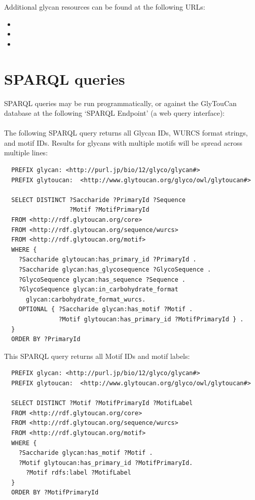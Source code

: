 \documentclass[12pt,a4paper]{article}
\begin{document}
\singlespace
\noindent Additional glycan resources can be found at the following URLs:
\begin{itemize}
\item {}
\item {}
\item {}
\end{itemize}
\doublespace
\clearpage

\section{SPARQL queries}
\label{sec:sparql_queries}
SPARQL queries may be run programmatically, or against the GlyTouCan database at the following `SPARQL Endpoint' (a web query interface):\\

\noindent {}\\

\noindent The following SPARQL query returns all Glycan IDs, WURCS format strings, and motif IDs. Results for glycans with multiple motifs will be spread across multiple lines:\\

\singlespace
\begin{verbatim}
  PREFIX glycan: <http://purl.jp/bio/12/glyco/glycan#>
  PREFIX glytoucan:  <http://www.glytoucan.org/glyco/owl/glytoucan#>

  SELECT DISTINCT ?Saccharide ?PrimaryId ?Sequence 
                  ?Motif ?MotifPrimaryId
  FROM <http://rdf.glytoucan.org/core>
  FROM <http://rdf.glytoucan.org/sequence/wurcs>
  FROM <http://rdf.glytoucan.org/motif>
  WHERE {
    ?Saccharide glytoucan:has_primary_id ?PrimaryId .
    ?Saccharide glycan:has_glycosequence ?GlycoSequence .
    ?GlycoSequence glycan:has_sequence ?Sequence .
    ?GlycoSequence glycan:in_carbohydrate_format 
      glycan:carbohydrate_format_wurcs.
    OPTIONAL { ?Saccharide glycan:has_motif ?Motif .
               ?Motif glytoucan:has_primary_id ?MotifPrimaryId } .
  }
  ORDER BY ?PrimaryId
\end{verbatim}
\doublespace

\newpage
\noindent This SPARQL query returns all Motif IDs and motif labels:\\

\singlespace
\begin{verbatim}
  PREFIX glycan: <http://purl.jp/bio/12/glyco/glycan#>
  PREFIX glytoucan:  <http://www.glytoucan.org/glyco/owl/glytoucan#>

  SELECT DISTINCT ?Motif ?MotifPrimaryId ?MotifLabel
  FROM <http://rdf.glytoucan.org/core>
  FROM <http://rdf.glytoucan.org/sequence/wurcs>
  FROM <http://rdf.glytoucan.org/motif>
  WHERE {
    ?Saccharide glycan:has_motif ?Motif .
    ?Motif glytoucan:has_primary_id ?MotifPrimaryId.
      ?Motif rdfs:label ?MotifLabel
  }
  ORDER BY ?MotifPrimaryId
\end{verbatim}
\doublespace
\end{document}
